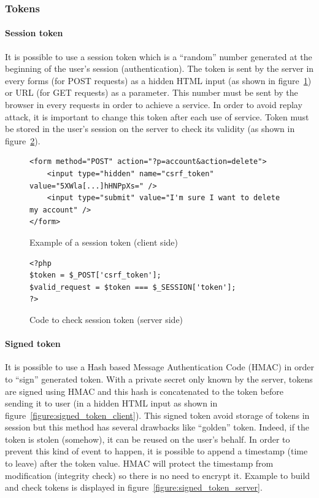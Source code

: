 \documentclass[a4paper,11pt,openany]{report}
\begin{document}
  \subsubsection{Tokens}
  
  \paragraph{Session token}
  It is possible to use a session token which is a ``random'' number generated at the beginning 
  of the user's session (authentication). The token is sent by the server in every forms (for POST 
  requests) as a hidden HTML input (as shown in figure~\ref{figure:session_token_client}) or URL 
  (for GET requests) as a parameter. This number must be sent by the browser in every requests in 
  order to achieve a service. In order to avoid replay attack, it is important to change this token 
  after each use of service. Token must be stored in the user's session on the server to check its 
  validity (as shown in figure~\ref{figure:session_token_server}).
  
  \begin{figure}[h!t]
  \begin{verbatim}
<form method="POST" action="?p=account&action=delete">
    <input type="hidden" name="csrf_token" value="5XWla[...]hHNPpXs=" />
    <input type="submit" value="I'm sure I want to delete my account" />
</form>
  \end{verbatim}
  \caption{Example of a session token (client side)}
  \label{figure:session_token_client}
  \end{figure}
  
  \begin{figure}[h!t]
  \begin{verbatim}
<?php
$token = $_POST['csrf_token'];
$valid_request = $token === $_SESSION['token'];
?>
  \end{verbatim}
  \caption{Code to check session token (server side)}
  \label{figure:session_token_server}
  \end{figure}
  
  \paragraph{Signed token} %
  It is possible to use a Hash based Message Authentication Code (HMAC) in order to ``sign'' 
  generated token. With a private secret only known by the server, tokens are signed using 
  HMAC and this hash is concatenated to the token before sending it to user (in a hidden 
  HTML input as shown in figure~\ref{figure:signed_token_client}). This signed token avoid 
  storage of tokens in session but this method has several drawbacks like ``golden'' token. 
  Indeed, if the token is stolen (somehow), it can be reused on the user's behalf. In order 
  to prevent this kind of event to happen, it is possible to append a timestamp (time to 
  leave) after the token value. HMAC will protect the timestamp from modification (integrity 
  check) so there is no need to encrypt it. Example to build and check tokens is displayed 
  in figure~\ref{figure:signed_token_server}.
  
\end{document}
